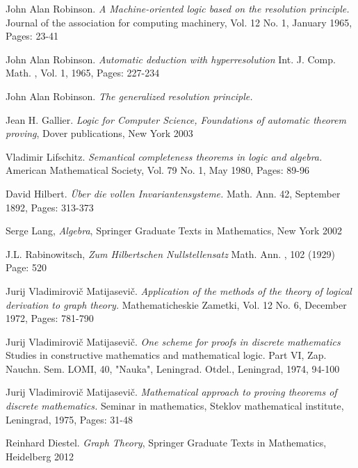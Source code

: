 {\newpage
{}
{}
\begin{thebibliography}{9}
 
John Alan Robinson.  
\textit{A Machine-oriented logic based on the resolution principle.} 
Journal of the association for computing machinery, Vol. 12 No. 1, January 1965, Pages: 23-41

John Alan Robinson.  
\textit{Automatic deduction with hyperresolution} 
Int. J. Comp. Math. , Vol. 1, 1965, Pages: 227-234
 
John Alan Robinson.  
\textit{The generalized resolution principle.} 

 Jean H. Gallier. \textit{Logic for Computer Science, Foundations of automatic theorem proving}, Dover publications, New York 2003

Vladimir Lifschitz.
\textit{Semantical completeness theorems in logic and algebra.} 
American Mathematical Society, Vol. 79 No. 1, May 1980, Pages: 89-96 

David Hilbert. \textit{\"Uber die vollen Invariantensysteme.} Math. Ann. 42, September 1892, Pages: 313-373

Serge Lang, \textit{Algebra}, Springer Graduate Texts in Mathematics, New York 2002


J.L. Rabinowitsch, \textit{Zum Hilbertschen Nullstellensatz} Math. Ann. , 102 (1929) Page: 520
 
Jurij Vladimirovi\v{c} Matijasevi\v{c}.
\textit{Application of the methods of the theory of logical derivation to graph theory.} Mathematicheskie Zametki, Vol. 12 No. 6, December 1972, Pages: 781-790

Jurij Vladimirovi\v{c} Matijasevi\v{c}.
\textit{One scheme for proofs in discrete mathematics} Studies in constructive mathematics and mathematical logic. Part VI, Zap. Nauchn. Sem. LOMI, 40, "Nauka", Leningrad. Otdel., Leningrad, 1974, 94-100 

Jurij Vladimirovi\v{c} Matijasevi\v{c}.
\textit{Mathematical approach to proving theorems of discrete mathematics.} 
Seminar in mathematics, Steklov mathematical institute, Leningrad, 1975, Pages: 31-48

 Reinhard Diestel. \textit{Graph Theory}, Springer Graduate Texts in Mathematics, Heidelberg 2012




\end{thebibliography}}

